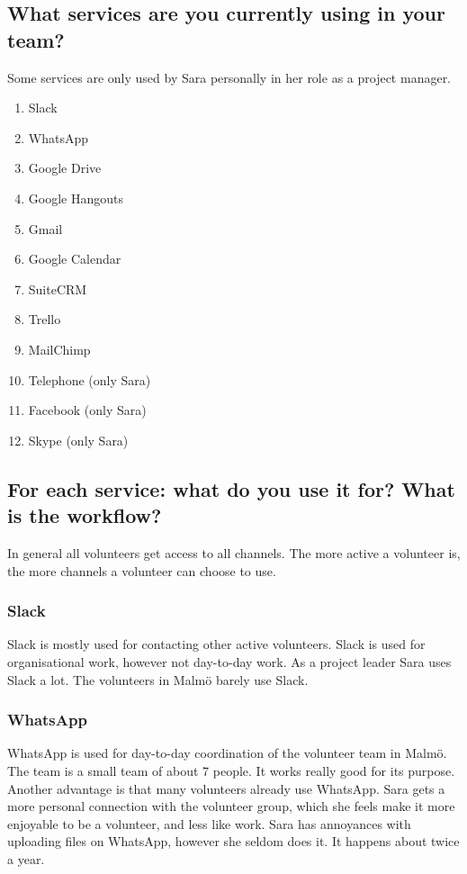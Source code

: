 \subsection{What services are you currently using in your team?}
Some services are only used by Sara personally in her role as a project manager.
\begin{enumerate}
\item Slack
\item WhatsApp
\item Google Drive
\item Google Hangouts
\item Gmail
\item Google Calendar
\item SuiteCRM
\item Trello
\item MailChimp
\item Telephone (only Sara)
\item Facebook (only Sara)
\item Skype (only Sara)
\end{enumerate}

\subsection{For each service: what do you use it for? What is the workflow?}
In general all volunteers get access to all channels. The more active a volunteer is, the more channels a volunteer can choose to use.

\subsubsection{Slack}
Slack is mostly used for contacting other active volunteers. Slack is used for organisational work, however not day-to-day work. As a project leader Sara uses Slack a lot. The volunteers in Malmö barely use Slack.
\subsubsection{WhatsApp}
WhatsApp is used for day-to-day coordination of the volunteer team in Malmö. The team is a small team of about 7 people. It works really good for its purpose. Another advantage is that many volunteers already use WhatsApp. Sara gets a more personal connection with the volunteer group, which she feels make it more enjoyable to be a volunteer, and less like work. Sara has annoyances with uploading files on WhatsApp, however she seldom does it. It happens about twice a year.

